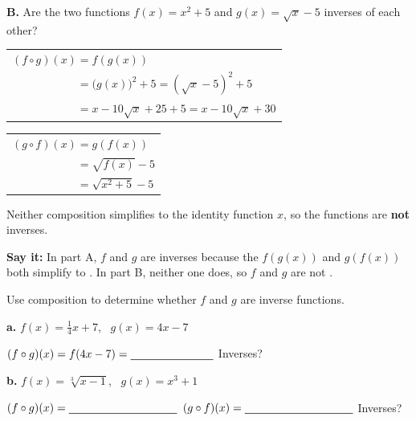 \textbf{B.} Are the two functions $f(x)=x^2+5$ and $g(x)=\sqrt{x}-5$ inverses of each other?

\begin{minipage}[t]{0.50\textwidth}
\vspace{0pt}
\renewcommand{\arraystretch}{1.25}
\begin{tabular}{l}
$(f\circ g)(x)=f(g(x))$ \\
$\phantom{(f\circ g)(x)}=\bigl(g(x)\bigr)^2+5=(\sqrt{x}-5)^2+5$ \\
$\phantom{(f\circ g)(x)}=x-10\sqrt{x}+25+5=x-10\sqrt{x}+30$ \\
\end{tabular}
\end{minipage}\hfill
\begin{minipage}[t]{0.46\textwidth}
\vspace{0pt}
\renewcommand{\arraystretch}{1.25}
\begin{tabular}{l}
$(g\circ f)(x)=g(f(x))$ \\
$\phantom{(g\circ f)(x)}=\sqrt{f(x)}-5$ \\
$\phantom{(g\circ f)(x)}=\sqrt{x^2+5}-5$ \\
\end{tabular}
\end{minipage}

Neither composition simplifies to the identity function $x$, so the functions are \textbf{not} inverses.

\textbf{Say it:} In part A, $f$ and $g$ are inverses because the \blank[2.6cm] $f(g(x))$ and $g(f(x))$ both simplify to \blank[1.2cm]. In part B, neither one does, so $f$ and $g$ are not \blank[2.4cm].

Use composition to determine whether $f$ and $g$ are inverse functions.

\begin{minipage}[t]{0.48\textwidth}
\vspace{0pt}
\textbf{a.} $f(x)=\tfrac14x+7$, \ $g(x)=4x-7$

\vspace{4pt}
$(f\circ g)(x)=f(4x-7)=\blank[2.6cm]$
\lines[3]
Inverses? \blank[2.2cm]
\end{minipage}\hfill
\begin{minipage}[t]{0.48\textwidth}
\vspace{0pt}
\textbf{b.} $f(x)=\sqrt[3]{x-1}$, \ $g(x)=x^3+1$

\vspace{4pt}
$(f\circ g)(x)=\blank[3.4cm]$
\lines[1]
$(g\circ f)(x)=\blank[3.4cm]$
\lines[1]
Inverses? \blank[2.2cm]
\end{minipage}

